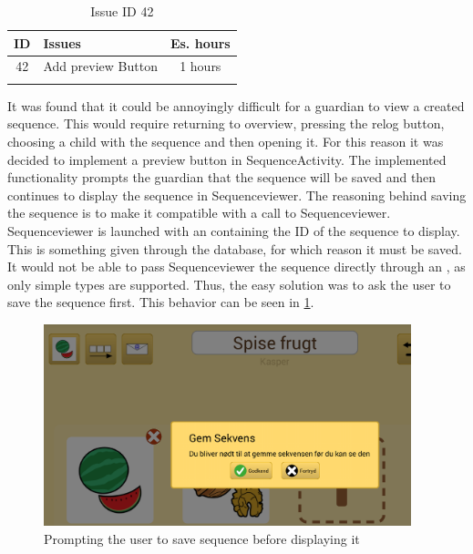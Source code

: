 \begin{longtable} { | c | p{12cm} | c | } 
\hline
	ID 	&	Issues	&		 Es. hours \\\hline
	42	&	Add preview Button	&	1 hours	\\\hline
\caption{Issue ID 42}
\label{tab:spr4_previewButton}
\end{longtable}

It was found that it could be annoyingly difficult for a guardian to view a created sequence. This would require returning to overview, pressing the relog button, choosing a child with the sequence and then opening it. For this reason it was decided to implement a preview button in SequenceActivity. The implemented functionality prompts the guardian that the sequence will be saved and then continues to display the sequence in Sequenceviewer. The reasoning behind saving the sequence is to make it compatible with a call to Sequenceviewer. Sequenceviewer is launched with an  containing the ID of the sequence to display. This is something given through the database, for which reason it must be saved. It would not be able to pass Sequenceviewer the sequence directly through an , as only simple types are supported. Thus, the easy solution was to ask the user to save the sequence first. This behavior can be seen in \ref{fig:savebeforepreview}.

\begin{figure}[H]
	\centering
	\includegraphics[width=0.95\textwidth]{Pics/Sprint4/savebeforepreview.png}
	\caption{Prompting the user to save sequence before displaying it}
	\label{fig:savebeforepreview}
\end{figure}